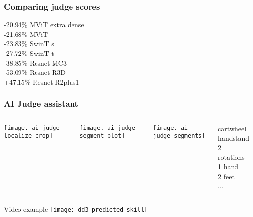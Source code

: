 \documentclass[aspectratio=169]{beamer}
\begin{document}
\begin{frame}
  \frametitle{Comparing judge scores}

  -20.94\% MViT extra dense  \\
  -21.68\% MViT  \\
  -23.83\% SwinT s  \\
  -27.72\% SwinT t  \\
  -38.85\% Resnet MC3  \\
  -53.09\% Resnet R3D  \\
  +47.15\% Resnet R2plus1  \\
\end{frame}


\begin{frame}
  \frametitle{AI Judge assistant}

  \begin{columns}[c]
  \end{columns}

  \begin{columns}[c]
  
    \begin{center}
      \texttt{[image: ai-judge-localize-crop]}
    \end{center}
    
    \begin{center}
      \texttt{[image: ai-judge-segment-plot]}
    \end{center}
    \begin{center}
      \texttt{[image: ai-judge-segments]}
    \end{center}

    
    \begin{center}
        cartwheel \\
        handstand \\
        2 rotations \\
        1 hand \\
        2 feet \\
        ... 
    \end{center}
      
  \end{columns}


\end{frame}

\begin{frame}{Video example}
  \texttt{[image: dd3-predicted-skill]} 
  
  \hypertarget{autoplay}{} %
  \href{run:dd3-annotated.mp4}{}
\end{frame}
\end{document}
